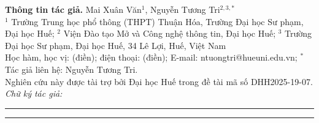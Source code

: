 \vspace{4pt}

{\raggedright\normalfont\fontsize{9}{11}\selectfont
\textbf{Thông tin tác giả.} Mai Xuân Văn$^{1}$, Nguyễn Tương Tri$^{2,3,*}$\\[1pt]
$^{1}$ Trường Trung học phổ thông (THPT) Thuận Hóa, Trường Đại học Sư phạm, Đại học Huế;
$^{2}$ Viện Đào tạo Mở và Công nghệ thông tin, Đại học Huế;
$^{3}$ Trường Đại học Sư phạm, Đại học Huế, 34 Lê Lợi, Huế, Việt Nam\\[1pt]
Học hàm, học vị: (điền); điện thoại: (điền); E-mail: ntuongtri@hueuni.edu.vn;
$^{*}$ Tác giả liên hệ: Nguyễn Tương Tri.\\[2pt]
Nghiên cứu này được tài trợ bởi Đại học Huế trong đề tài mã số DHH2025-19-07.
\hfill\textit{Chữ ký tác giả:} \rule{3.5cm}{0.4pt}\hfill\rule{3.5cm}{0.4pt}\hspace*{\fill}
\par}
